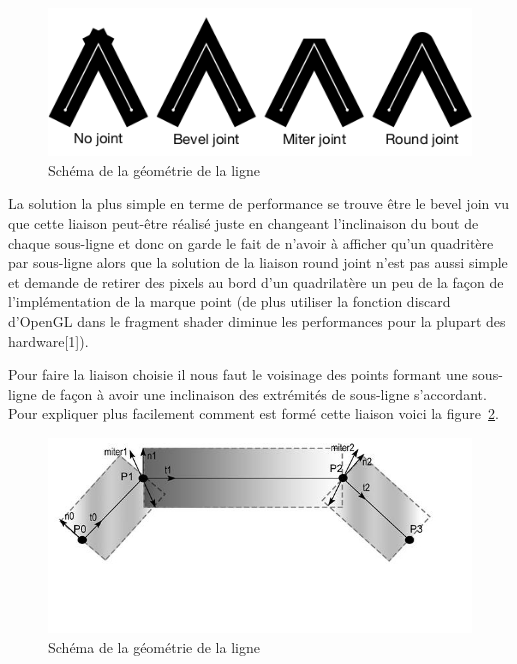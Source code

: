 \documentclass[12pt]{article}
\begin{document}
\begin{figure}[htp]
  \centering
  \includegraphics[scale=0.8]{images/line-joints}
  \caption{Schéma de la géométrie de la ligne}
  \label{fig:joint}
\end{figure}

La solution la plus simple en terme de performance se trouve être le \og bevel join \fg{} vu que cette liaison peut-être réalisé juste en changeant l’inclinaison du bout de chaque sous-ligne et donc on garde le fait de n’avoir à afficher qu’un quadritère par sous-ligne alors que la solution de la liaison  \og round joint \fg{} n’est pas aussi simple et demande de retirer des pixels au bord d’un quadrilatère un peu de la façon de l’implémentation de la marque point (de plus utiliser la fonction discard d’OpenGL dans le fragment shader diminue les performances pour la plupart des hardware[1]).

Pour faire la liaison choisie il nous faut le voisinage des points formant une sous-ligne de façon à avoir une inclinaison des extrémités de sous-ligne s’accordant. Pour expliquer plus facilement comment est formé cette liaison voici la figure~\ref{fig:geom_line}.


\begin{figure}[htp]
  \centering
  \includegraphics[scale=0.8]{images/line_geom}
  \caption{Schéma de la géométrie de la ligne}
  \label{fig:geom_line}
\end{figure}
\end{document}
